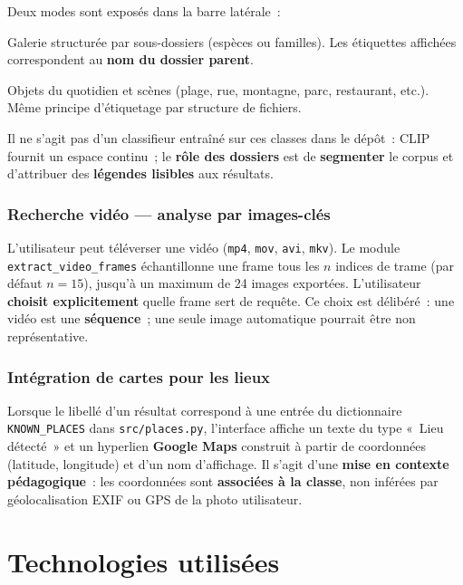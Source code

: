 \documentclass[11pt,a4paper,openany]{report}
\begin{document}
Deux modes sont exposés dans la barre latérale~:
\begin{description}[style=nextline, leftmargin=0cm]
  \item[\texttt{animaux}] Galerie structurée par sous-dossiers (espèces ou familles). Les étiquettes affichées correspondent au \textbf{nom du dossier parent}.
  \item[\texttt{objets\_lieux}] Objets du quotidien et scènes (plage, rue, montagne, parc, restaurant, etc.). Même principe d'étiquetage par structure de fichiers.
\end{description}
Il ne s'agit pas d'un classifieur entraîné sur ces classes dans le dépôt~: CLIP fournit un espace continu~; le \textbf{rôle des dossiers} est de \textbf{segmenter} le corpus et d'attribuer des \textbf{légendes lisibles} aux résultats.

\subsection{Recherche vidéo — analyse par images-clés}

L'utilisateur peut téléverser une vidéo (\texttt{mp4}, \texttt{mov}, \texttt{avi}, \texttt{mkv}). Le module \texttt{extract\_video\_frames} échantillonne une frame tous les $n$ indices de trame (par défaut $n=15$), jusqu'à un maximum de 24 images exportées. L'utilisateur \textbf{choisit explicitement} quelle frame sert de requête. Ce choix est délibéré~: une vidéo est une \textbf{séquence}~; une seule image automatique pourrait être non représentative.

\subsection{Intégration de cartes pour les lieux}

Lorsque le libellé d'un résultat correspond à une entrée du dictionnaire \texttt{KNOWN\_PLACES} dans \texttt{src/places.py}, l'interface affiche un texte du type «~Lieu détecté~» et un hyperlien \textbf{Google Maps} construit à partir de coordonnées (latitude, longitude) et d'un nom d'affichage. Il s'agit d'une \textbf{mise en contexte pédagogique}~: les coordonnées sont \textbf{associées à la classe}, non inférées par géolocalisation EXIF ou GPS de la photo utilisateur.

\chapter{Technologies utilisées}
\end{document}
